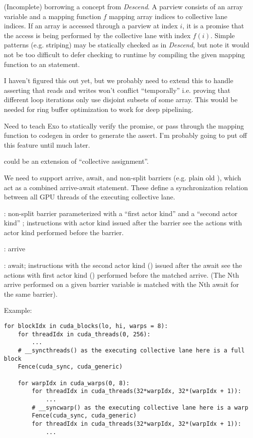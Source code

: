\filbreak
{} (Incomplete) borrowing a concept from \textit{Descend}.
A parview consists of an array variable and a mapping function $f$ mapping array indices to collective lane indices.
If an array is accessed through a parview at index $i$, it is a promise that the access is being performed by the collective lane with index $f(i)$.
Simple patterns (e.g. striping) may be statically checked as in \textit{Descend}, but note it would not be too difficult to defer checking to runtime by compiling the given mapping function to an  statement.

I haven't figured this out yet, but we probably need to extend this to handle asserting that reads and writes won't conflict ``temporally'' i.e. proving that different loop iterations only use disjoint subsets of some array.
This would be needed for ring buffer optimization to work for deep pipelining.

 Need to teach Exo to statically verify the promise, or pass through the mapping function to codegen in order to generate the assert.
I'm probably going to put off this feature until much later.

 could be an extension of ``collective assignment''.

\filbreak
{} We need to support arrive, await, and non-split barriers (e.g. plain old ), which act as a combined arrive-await statement.
These define a synchronization relation between all GPU threads of the executing collective lane.

: non-split barrier parameterized with a ``first actor kind''  and a ``second actor kind'' ; instructions with actor kind  issued after the barrier see the actions with actor kind  performed before the barrier.

: arrive

: await; instructions with the second actor kind () issued after the await see the actions with first actor kind () performed before the matched arrive.
(The Nth arrive performed on a given barrier variable is matched with the Nth await for the same barrier).

\filbreak
Example:

{\color{lightttColor}
\begin{verbatim}
for blockIdx in cuda_blocks(lo, hi, warps = 8):
    for threadIdx in cuda_threads(0, 256):
        ...
    # __syncthreads() as the executing collective lane here is a full block
    Fence(cuda_sync, cuda_generic)

    for warpIdx in cuda_warps(0, 8):
        for threadIdx in cuda_threads(32*warpIdx, 32*(warpIdx + 1)):
            ...
        # __syncwarp() as the executing collective lane here is a warp
        Fence(cuda_sync, cuda_generic)
        for threadIdx in cuda_threads(32*warpIdx, 32*(warpIdx + 1)):
            ...
\end{verbatim}
}

